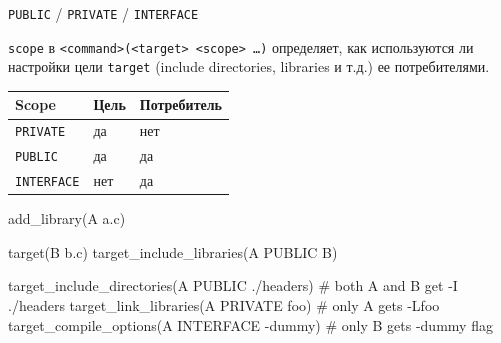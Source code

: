 \documentclass[compress, 8pt, aspectratio=169]{beamer}
\begin{document}
\begin{frame}[fragile]{\texttt{PUBLIC} / \texttt{PRIVATE} /
  \texttt{INTERFACE}}

  \texttt{scope} в \texttt{<command>(<target> <scope> \dots)} определяет, как
  используются ли настройки цели \texttt{target} (include directories, libraries
  и т.д.) ее потребителями.

  \vspace{0.5em}

  \begin{center}

    \renewcommand{\arraystretch}{1.4}

    \begin{tabular}{|p{3.2cm}|p{4.7cm}|p{4.7cm}|}

      \hline

      \textbf{Scope} & \textbf{Цель}
        & \textbf{Потребитель} \\

      \hline

      \texttt{PRIVATE} & да & нет \\

      \hline

      \texttt{PUBLIC} & да & да \\

      \hline

      \texttt{INTERFACE} & нет & да \\

      \hline

    \end{tabular}

  \end{center}

  \bigbreak

  \begin{myinplacelisting}[minted language=cmake]
add_library(A a.c)

target(B b.c)
target_include_libraries(A PUBLIC B)

target_include_directories(A PUBLIC ./headers) # both A and B get -I ./headers
target_link_libraries(A PRIVATE foo) # only A gets -Lfoo
target_compile_options(A INTERFACE -dummy) # only B gets -dummy flag
  \end{myinplacelisting}

\end{frame}
\end{document}
